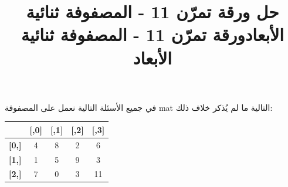 \documentclass[14pt]{extarticle}
\title{حل ورقة تمرّن 11 - المصفوفة ثنائية الأبعاد}
\title{ورقة تمرّن 11 - المصفوفة ثنائية الأبعاد}
\begin{document}
\maketitle
\thispagestyle{fancy}

في جميع الأسئلة التالية نعمل على المصفوفة \textenglish{mat} التالية ما لم يُذكر خلاف ذلك:

\begin{center}
\begin{english}
\begin{tabular}{c|cccc}
 & \textbf{[,0]} & \textbf{[,1]} & \textbf{[,2]} & \textbf{[,3]} \\
\hline
\textbf{[0,]} & 4  & 8  & 2  & 6  \\
\textbf{[1,]} & 1  & 5  & 9  & 3  \\
\textbf{[2,]} & 7  & 0  & 3  & 11 \\
\end{tabular}
\end{english}
\end{center}
\end{document}
